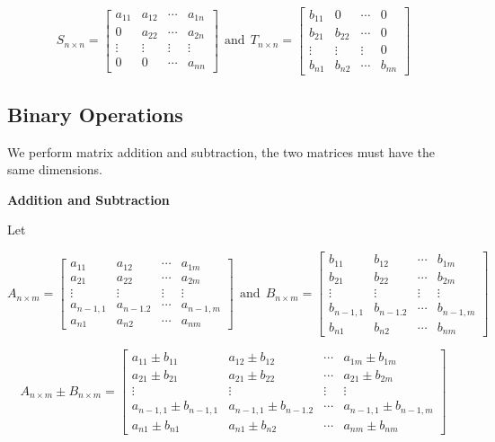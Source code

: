 \documentclass[
]{book}
\begin{document}
\[
S_{n\times n} = \left[\begin{array}{ccccc} 
a_{11} & a_{12} & \cdots & a_{1n}  \\ 
0 & a_{22} & \cdots & a_{2n}  \\ 
\vdots & \vdots & \vdots & \vdots  \\
0 & 0 & \cdots & a_{nn}  
\end{array}
\right]
~
~
\text{and}
~
~
T_{n\times n} = \left[\begin{array}{ccccc} 
b_{11} & 0 & \cdots & 0  \\ 
b_{21} & b_{22} & \cdots & 0  \\ 
\vdots & \vdots & \vdots & 0  \\
b_{n1} & b_{n2} & \cdots & b_{nn}  
\end{array}
\right]
\]

\hfill\break

\hypertarget{binary-operations}{%
\subsection{Binary Operations}\label{binary-operations}}

We perform matrix addition and subtraction, the two matrices must have the same dimensions.

\hfill\break

\textbf{Addition and Subtraction}

Let

\[
A_{n\times m} = \left[\begin{array}{ccccc} 
a_{11} & a_{12} & \cdots & a_{1m}  \\ 
a_{21} & a_{22} & \cdots & a_{2m}  \\ 
\vdots & \vdots & \vdots & \vdots  \\
a_{n-1,1} & a_{n-1.2} & \cdots & a_{n-1,m}  \\
a_{n1} & a_{n2} & \cdots & a_{nm}  
\end{array}
\right]
~
~
\text{and}
~
~
B_{n\times m} = \left[\begin{array}{ccccc} 
b_{11} & b_{12} & \cdots & b_{1m}  \\ 
b_{21} & b_{22} & \cdots & b_{2m}  \\ 
\vdots & \vdots & \vdots & \vdots  \\
b_{n-1,1} & b_{n-1.2} & \cdots & b_{n-1,m}  \\
b_{n1} & b_{n2} & \cdots & b_{nm}  
\end{array}
\right]
\]

\[
A_{n\times m}\pm B_{n\times m} = \left[\begin{array}{ccccc} 
a_{11}\pm b_{11} & a_{12}\pm b_{12} & \cdots & a_{1m}\pm b_{1m}  \\ 
a_{21}\pm b_{21} & a_{21}\pm b_{22} & \cdots & a_{21}\pm b_{2m}  \\ 
\vdots & \vdots & \vdots & \vdots  \\
a_{n-1,1}\pm b_{n-1,1} & a_{n-1,1}\pm b_{n-1.2} & \cdots & a_{n-1,1}\pm b_{n-1,m}  \\
a_{n1}\pm b_{n1} & a_{n1}\pm b_{n2} & \cdots & a_{nm}\pm b_{nm}  
\end{array}
\right]
\]\\
\end{document}
